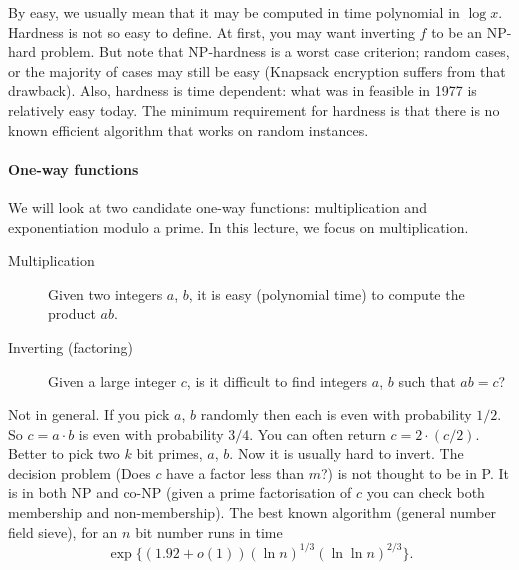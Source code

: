 \documentclass[a4paper, 11pt, openany]{book}
\numberwithin{equation}{section}
\theoremstyle{plain}
\theoremstyle{definition}
\begin{document}
By easy, we usually mean that it may be computed in time polynomial in $\log x$. Hardness is not so easy to define. At first, you may want inverting $f$ to be an NP-hard problem. But note that NP-hardness is a worst case criterion; random cases, or the majority of cases may still be easy (Knapsack encryption suffers from that drawback). Also, hardness is time dependent: what was in feasible in 1977 is relatively easy today. The minimum requirement for hardness is that there is no known efficient algorithm that works on random instances.




\paragraph{One-way functions}
    
We will look at two candidate one-way functions: multiplication and exponentiation modulo a prime. In this lecture, we focus on multiplication.

\begin{description}
\item [Multiplication] Given two integers $a$, $b$, it is easy (polynomial time) to compute the product $ab$.

\item[Inverting (factoring)] Given a large integer $c$, is it difficult to find integers $a$, $b$ such that $ab = c$?
\end{description}

Not in general. If you pick $a$, $b$ randomly then each is even with probability $1/2$. So $c = a \cdot b$ is even with probability $3/4$. You can often return $c = 2 \cdot (c/2)$.
Better to pick two $k$ bit primes, $a$, $b$. Now it is usually hard to invert.
The decision problem (Does $c$ have a factor less than $m$?) is not thought to be in P. It is in both NP and co-NP (given a prime factorisation of $c$ you can check both membership and non-membership). The best known algorithm (general number field sieve), for an $n$ bit number runs in time 
\[
    \exp \{ (1.92 + o(1)) (\ln n)^{1/3} (\ln \ln n)^{2/3} \}. 
\]
\end{document}
